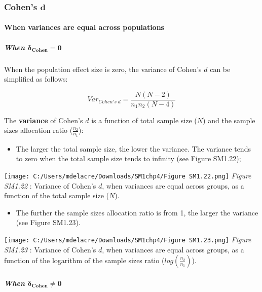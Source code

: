 \documentclass[
  english,
  man,mask,floatsintext]{apa6}
\providecommand{\tightlist}{%
  \setlength{\itemsep}{0pt}\setlength{\parskip}{0pt}}
\let\oldparagraph\paragraph
\renewcommand{\paragraph}[1]{\oldparagraph{#1}\mbox{}}
\let\oldsubparagraph\subparagraph
\renewcommand{\subparagraph}[1]{\oldsubparagraph{#1}\mbox{}}
\begin{document}
\hypertarget{cohens-bmd}{%
\subsubsection{\texorpdfstring{Cohen's \(\bm{d}\)}{Cohen's \textbackslash bm\{d\}}}\label{cohens-bmd}}

\hypertarget{when-variances-are-equal-across-populations-2}{%
\paragraph{When variances are equal across populations}\label{when-variances-are-equal-across-populations-2}}

\hypertarget{when-bmdelta_cohen0}{%
\subparagraph{\texorpdfstring{When \(\bm{\delta_{Cohen}=0}\)}{When \textbackslash bm\{\textbackslash delta\_\{Cohen\}=0\}}}\label{when-bmdelta_cohen0}}

When the population effect size is zero, the variance of Cohen's \(d\) can be simplified as follows:

\[Var_{Cohen's \; d} = \frac{N(N-2)}{n_1n_2(N-4)}\]

The \textbf{variance} of Cohen's \(d\) is a function of total sample size (\(N\)) and the sample sizes allocation ratio (\(\frac{n_2}{n_1}\)):

\begin{itemize}
\tightlist
\item
  The larger the total sample size, the lower the variance. The variance tends to zero when the total sample size tends to infinity (see Figure SM1.22);
\end{itemize}

\texttt{[image: C:/Users/mdelacre/Downloads/SM1chp4/Figure SM1.22.png]}
\emph{Figure SM1.22} : Variance of Cohen's \(d\), when variances are equal across groups, as a function of the total sample size (\(N\)).

\begin{itemize}
\tightlist
\item
  The further the sample sizes allocation ratio is from 1, the larger the variance (see Figure SM1.23).
\end{itemize}

\texttt{[image: C:/Users/mdelacre/Downloads/SM1chp4/Figure SM1.23.png]}
\emph{Figure SM1.23} : Variance of Cohen's \(d\), when variances are equal across groups, as a function of the logarithm of the sample sizes ratio (\(log\left(\frac{n_2}{n_1} \right)\)).

\hypertarget{when-bmdelta_cohenneq-0}{%
\subparagraph{\texorpdfstring{When \(\bm{\delta_{Cohen}\neq 0}\)}{When \textbackslash bm\{\textbackslash delta\_\{Cohen\}\textbackslash neq 0\}}}\label{when-bmdelta_cohenneq-0}}
\end{document}
